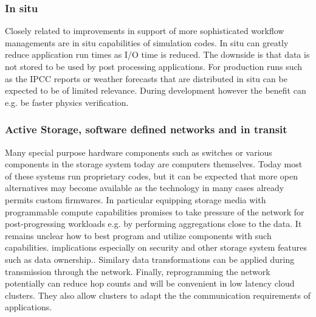 \documentclass{../../template/esiwace-report}
\begin{document}






\subsubsection{In situ}

Closely related to improvements in support of more sophisticated workflow managements are in situ capabilities of simulation codes.
In situ can greatly reduce application run times as I/O time is reduced.
The downside is that data is not stored to be used by post processing applications.
For production runs such as the IPCC reports or weather forecasts that are distributed in situ can be expected to be of limited relevance.
During development however the benefit can e.g. be faster physics verification.



\subsubsection{Active Storage, software defined networks and in transit}

Many special purpose hardware components such as switches or various components in the storage system today are computers themselves. Today most of these systems run proprietary codes, but it can be expected that more open alternatives may become available as the technology in many cases already permits custom firmwares.
In particular equipping storage media with programmable compute capabilities promises to take pressure of the network for post-progressing workloads e.g. by performing aggregations close to the data.
It remains unclear how to best program and utilize components with such capabilities.
implications especially on security and other storage system features such as data ownership..
Similary data transformations can be applied during transmission through the network.
Finally, reprogramming the network potentially can reduce hop counts and will be convenient in low latency cloud clusters. They also allow clusters to adapt the the communication requirements of applications.
\end{document}
